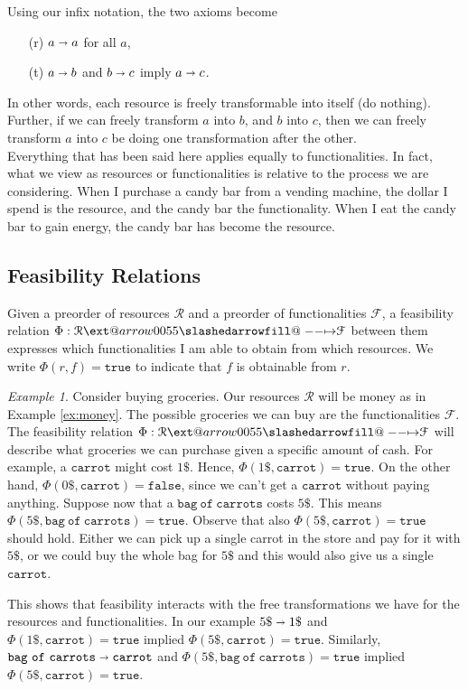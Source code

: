 \documentclass[12pt]{article}
\makeatletter
\theoremstyle{definition}
\theoremstyle{plain}
\theoremstyle{plain}
\theoremstyle{plain}
\theoremstyle{plain}
\theoremstyle{remark}
\newtheorem{example}{Example}[section]
\theoremstyle{remark}
\newcommand{\mc}[1]{\mathcal{#1}}
\newcommand{\true}{\mathtt{true}}
\def\slashedarrowfill@#1#2#3#4#5{%
	$\m@th\thickmuskip0mu\medmuskip\thickmuskip\thinmuskip\thickmuskip
	\relax#5#1\mkern-7mu%
	\cleaders\hbox{$#5\mkern-2mu#2\mkern-2mu$}\hfill
	\mathclap{#3}\mathclap{#2}%
	\cleaders\hbox{$#5\mkern-2mu#2\mkern-2mu$}\hfill
	\mkern-7mu#4$%
}
\def\rightslashedarrowfill@{%
	\slashedarrowfill@\relbar\relbar\mapstochar\rightarrow}
\newcommand\xslashedrightarrow[2][]{%
	\ext@arrow 0055{\rightslashedarrowfill@}{#1}{#2}}
\makeatother
\begin{document}
Using our infix notation, the two axioms become 
\begin{itemize}
	\item[(r)] $a \shortrightarrow a$ for all $a$,
	\item[(t)] $a \shortrightarrow b$ and $b \shortrightarrow c$ imply $a \shortrightarrow c$.
\end{itemize}  
In other words, each resource is freely transformable into itself (do nothing). Further, if we can freely transform $a$ into $b$, and $b$ into $c$, then we can freely transform $a$ into $c$ be doing one transformation after the other. \\

Everything that has been said here applies equally to functionalities. In fact, what we view as resources or functionalities is relative to the process we are considering. When I purchase a candy bar from a vending machine, the dollar I spend is the resource, and the candy bar the functionality. When I eat the candy bar to gain energy, the candy bar has become the resource.

\subsection{Feasibility Relations}
Given a preorder of resources $\mc{R}$ and a preorder of functionalities $\mc{F}$, a feasibility relation $\Phi: \mc{R} \xslashedrightarrow{} \mc{F}$ between them expresses which functionalities I am able to obtain from which resources. We write $\Phi(r,f) = \mathtt{true}$ to indicate that $f$ is obtainable from $r$.

\begin{example}
	Consider buying groceries. Our resources $\mc{R}$ will be money as in Example \ref{ex:money}. The possible groceries we can buy are the functionalities $\mc{F}$. The feasibility relation $\Phi: \mc{R} \xslashedrightarrow{} \mc{F}$ will describe what groceries we can purchase given a specific amount of cash. For example, a $\mathtt{carrot}$ might cost $1\$$. Hence, $\Phi(1\$,\mathtt{carrot}) = \mathtt{true}$. On the other hand, $\Phi(0\$, \mathtt{carrot}) = \mathtt{false}$, since we can't get a $\mathtt{carrot}$ without paying anything. Suppose now that a $\mathtt{bag\ of\ carrots}$ costs $5\$$. This means $\Phi(5\$,\mathtt{bag\ of\ carrots}) = \mathtt{true}$. Observe that also $\Phi(5\$,\mathtt{carrot}) = \true$ should hold. Either we can pick up a single carrot in the store and pay for it with $5\$$, or we could buy the whole bag for $5\$$ and this would also give us a single $\mathtt{carrot}$. 
	
	This shows that feasibility interacts with the free transformations we have for the resources and functionalities. In our example $5\$ \shortrightarrow 1\$$ and $\Phi(1\$, \mathtt{carrot}) = \true$ implied $\Phi(5\$, \mathtt{carrot}) = \true$. Similarly, $\mathtt{bag\ of\ carrots} \shortrightarrow \mathtt{carrot}$ and $\Phi(5\$,\mathtt{bag\ of\ carrots}) = \mathtt{true}$ implied $\Phi(5\$,\mathtt{carrot}) = \true$.
\end{example}
\end{document}

